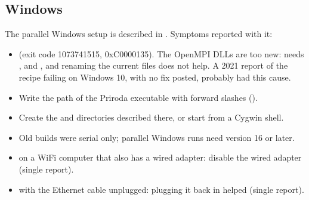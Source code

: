 \documentclass[letterpaper,10pt,english,openany,oneside]{sphinxmanual}
\begin{document}
\subsection{Windows}
\label{\detokenize{troubleshooting/common-problems:windows}}
\sphinxAtStartPar
The parallel Windows setup is described in {\hyperref[\detokenize{start/parallel:running-windows-parallel}]{}}. Symptoms reported with it:
\begin{itemize}
\item {} 
\sphinxAtStartPar
{} (exit code \sphinxhyphen{}1073741515, 0xC0000135). The OpenMPI
DLLs are too new:  needs ,  and , and
renaming the current  files does not help. A 2021 report of the recipe failing on Windows 10, with no fix
posted, probably had this cause. 

\item {} 
\sphinxAtStartPar
{} Write the path of the Priroda executable with forward slashes
(). 

\item {} 
\sphinxAtStartPar
{} Create the  and  directories
described there, or start from a Cygwin shell. 

\item {} 
\sphinxAtStartPar
{} Old builds were serial only; parallel Windows runs need version 16 or later.



\item {} 
\sphinxAtStartPar
{} on a Wi\sphinxhyphen{}Fi computer that also has a wired adapter:
disable the wired adapter (single report).  

\item {} 
\sphinxAtStartPar
{} with the Ethernet cable unplugged: plugging it back in helped (single report).



\end{itemize}
\end{document}
